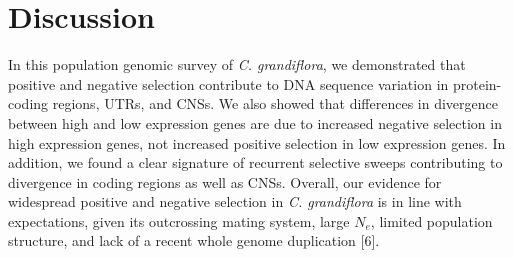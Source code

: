 \section{Discussion}
In this population genomic survey of \textit{C. grandiflora}, we demonstrated that positive and negative selection contribute to DNA sequence variation in protein-coding regions, UTRs, and CNSs. We also showed that differences in divergence between high and low expression genes are due to increased negative selection in high expression genes, not increased positive selection in low expression genes. In addition, we found a clear signature of recurrent selective sweeps contributing to divergence in coding regions as well as CNSs. Overall, our evidence for widespread positive and negative selection in \textit{C. grandiflora} is in line with expectations, given its outcrossing mating system, large $N_{e}$, limited population structure, and lack of a recent whole genome duplication [6].

